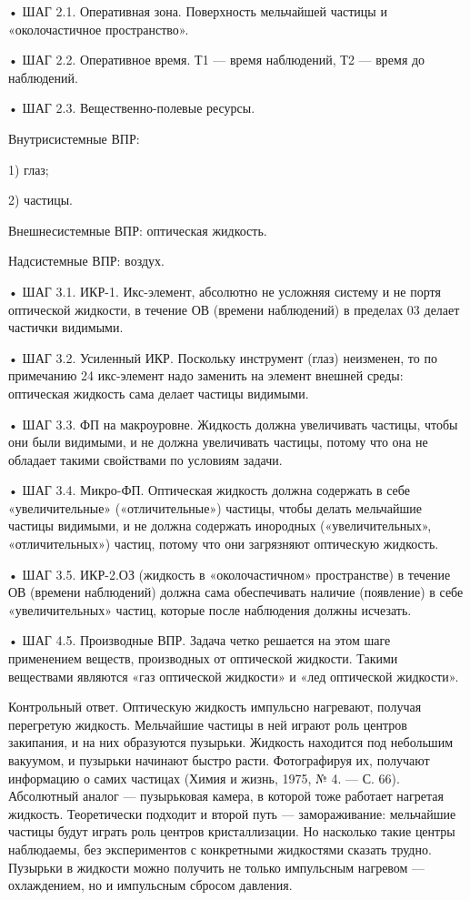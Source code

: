 •  ШАГ  2.1.  Оперативная   зона.  Поверхность  мельчайшей  частицы  и
«околочастичное пространство».

• ШАГ  2.2. Оперативное время.  Т1 — время  наблюдений, Т2 —  время до
наблюдений.

• ШАГ 2.3. Вещественно-полевые ресурсы.

Внутрисистемные ВПР:

1) глаз;

2) частицы.

Внешнесистемные ВПР: оптическая жидкость.

Надсистемные ВПР: воздух.


•  ШАГ 3.1.  ИКР-1. Икс-элемент,  абсолютно не  усложняя систему  и не
портя  оптической  жидкости,  в  течение  ОВ  (времени  наблюдений)  в
пределах 03 делает частички видимыми.

• ШАГ 3.2. Усиленный ИКР. Поскольку инструмент (глаз) неизменен, то по
примечанию  24 икс-элемент  надо  заменить на  элемент внешней  среды:
оптическая жидкость сама делает частицы видимыми.

• ШАГ  3.3. ФП  на макроуровне.  Жидкость должна  увеличивать частицы,
чтобы они были  видимыми, и не должна увеличивать  частицы, потому что
она не обладает такими свойствами по условиям задачи.

•  ШАГ 3.4.  Микро-ФП.  Оптическая жидкость  должна  содержать в  себе
«увеличительные»  («отличительные») частицы,  чтобы делать  мельчайшие
частицы видимыми,  и не должна содержать  инородных («увеличительных»,
«отличительных»)   частиц,  потому   что  они   загрязняют  оптическую
жидкость.

•  ШАГ  3.5. ИКР-2.ОЗ  (жидкость  в  «околочастичном» пространстве)  в
течение  ОВ  (времени  наблюдений) должна  сама  обеспечивать  наличие
(появление) в  себе «увеличительных» частиц, которые  после наблюдения
должны исчезать.

•  ШАГ  4.5. Производные  ВПР.  Задача  четко  решается на  этом  шаге
применением  веществ,  производных   от  оптической  жидкости.  Такими
веществами  являются  «газ  оптической  жидкости»  и  «лед  оптической
жидкости».

Контрольный  ответ. Оптическую  жидкость импульсно  нагревают, получая
перегретую  жидкость. Мельчайшие  частицы  в ней  играют роль  центров
закипания,  и  на  них  образуются пузырьки.  Жидкость  находится  под
небольшим  вакуумом, и  пузырьки начинают  быстро расти.  Фотографируя
их,  получают  информацию  о  самих частицах  (Химия  и  жизнь,  1975,
№  4.   —  С.   66).  Абсолютный  аналог   —  пузырьковая   камера,  в
которой  тоже  работает  нагретая жидкость.  Теоретически  подходит  и
второй  путь —  замораживание:  мельчайшие частицы  будут играть  роль
центров  кристаллизации. Но  насколько  такие  центры наблюдаемы,  без
экспериментов  с конкретными  жидкостями  сказать  трудно. Пузырьки  в
жидкости можно  получить не только импульсным  нагревом — охлаждением,
но и импульсным сбросом давления.

